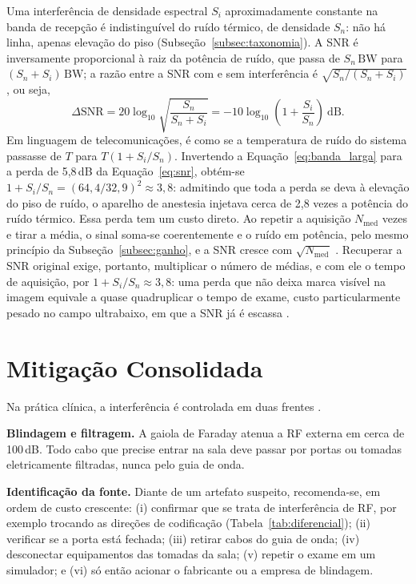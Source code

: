 \documentclass[portuguese]{sbcreviews-2025}%
\begin{document}
Uma interferência de densidade espectral $S_i$ aproximadamente constante na banda de recepção é indistinguível do ruído térmico, de densidade $S_n$: não há linha, apenas elevação do piso (Subseção~\ref{subsec:taxonomia}). A SNR é inversamente proporcional à raiz da potência de ruído, que passa de $S_n\,\mathrm{BW}$ para $(S_n + S_i)\,\mathrm{BW}$; a razão entre a SNR com e sem interferência é $\sqrt{S_n/(S_n + S_i)}$, ou seja,
\begin{equation}
\Delta\mathrm{SNR} = 20\log_{10}\sqrt{\frac{S_n}{S_n + S_i}} = -10\log_{10}\left(1 + \frac{S_i}{S_n}\right)\ \mathrm{dB}.
\label{eq:banda_larga}
\end{equation}
Em linguagem de telecomunicações, é como se a temperatura de ruído do sistema passasse de $T$ para $T(1 + S_i/S_n)$. Invertendo a Equação~\eqref{eq:banda_larga} para a perda de 5,8\,dB da Equação~\eqref{eq:snr}, obtém-se $1 + S_i/S_n = (64{,}4/32{,}9)^2 \approx 3{,}8$: admitindo que toda a perda se deva à elevação do piso de ruído, o aparelho de anestesia injetava cerca de 2,8 vezes a potência do ruído térmico. Essa perda tem um custo direto. Ao repetir a aquisição $N_{\mathrm{med}}$ vezes e tirar a média, o sinal soma-se coerentemente e o ruído em potência, pelo mesmo princípio da Subseção~\ref{subsec:ganho}, e a SNR cresce com $\sqrt{N_{\mathrm{med}}}$ \citep{haacke1999}. Recuperar a SNR original exige, portanto, multiplicar o número de médias, e com ele o tempo de aquisição, por $1 + S_i/S_n \approx 3{,}8$: uma perda que não deixa marca visível na imagem equivale a quase quadruplicar o tempo de exame, custo particularmente pesado no campo ultrabaixo, em que a SNR já é escassa \citep{marques2019lowfield}.


\section{Mitigação Consolidada}
\label{sec:mitigacao}

Na prática clínica, a interferência é controlada em duas frentes \citep{kwok2024rf}.

\textbf{Blindagem e filtragem.} A gaiola de Faraday atenua a RF externa em cerca de 100\,dB. Todo cabo que precise entrar na sala deve passar por portas ou tomadas eletricamente filtradas, nunca pelo guia de onda.

\textbf{Identificação da fonte.} Diante de um artefato suspeito, recomenda-se, em ordem de custo crescente: (i) confirmar que se trata de interferência de RF, por exemplo trocando as direções de codificação (Tabela~\ref{tab:diferencial}); (ii) verificar se a porta está fechada; (iii) retirar cabos do guia de onda; (iv) desconectar equipamentos das tomadas da sala; (v) repetir o exame em um simulador; e (vi) só então acionar o fabricante ou a empresa de blindagem.
\end{document}
